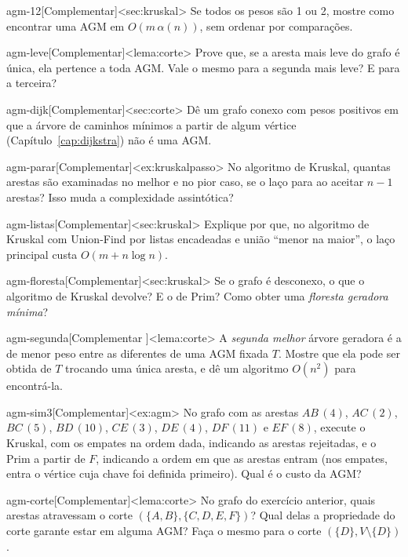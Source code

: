 \begin{exercicio}{agm-12}[Complementar]<sec:kruskal>
Se todos os pesos são 1 ou 2, mostre como encontrar uma AGM em $O(m\,\alpha(n))$, sem ordenar por comparações.
\end{exercicio}
\begin{exercicio}{agm-leve}[Complementar]<lema:corte>
Prove que, se a aresta mais leve do grafo é única, ela pertence a toda AGM. Vale o mesmo para a segunda mais leve? E para a terceira?
\end{exercicio}
\begin{exercicio}{agm-dijk}[Complementar]<sec:corte>
Dê um grafo conexo com pesos positivos em que a árvore de caminhos mínimos a partir de algum vértice (Capítulo~\ref{cap:dijkstra}) não é uma AGM.
\end{exercicio}
\begin{exercicio}{agm-parar}[Complementar]<ex:kruskalpasso>
No algoritmo de Kruskal, quantas arestas são examinadas no melhor e no pior caso, se o laço para ao aceitar $n-1$ arestas? Isso muda a complexidade assintótica?
\end{exercicio}
\begin{exercicio}{agm-listas}[Complementar]<sec:kruskal>
Explique por que, no algoritmo de Kruskal com Union-Find por listas encadeadas e união ``menor na maior'', o laço principal custa $O(m+n\log n)$.
\end{exercicio}
\begin{exercicio}{agm-floresta}[Complementar]<sec:kruskal>
Se o grafo é desconexo, o que o algoritmo de Kruskal devolve? E o de Prim? Como obter uma \emph{floresta geradora mínima}?
\end{exercicio}
\begin{exercicio}{agm-segunda}[Complementar \estrela]<lema:corte>
A \emph{segunda melhor} árvore geradora é a de menor peso entre as diferentes de uma AGM fixada $T$. Mostre que ela pode ser obtida de $T$ trocando uma única aresta, e dê um algoritmo $O(n^2)$ para encontrá-la.
\end{exercicio}
\begin{exercicio}{agm-sim3}[Complementar]<ex:agm>
No grafo com as arestas $AB\,(4)$, $AC\,(2)$, $BC\,(5)$, $BD\,(10)$, $CE\,(3)$, $DE\,(4)$, $DF\,(11)$ e $EF\,(8)$, execute o Kruskal, com os empates na ordem dada, indicando as arestas rejeitadas, e o Prim a partir de $F$, indicando a ordem em que as arestas entram (nos empates, entra o vértice cuja chave foi definida primeiro). Qual é o custo da AGM?
\end{exercicio}
\begin{exercicio}{agm-corte}[Complementar]<lema:corte>
No grafo do exercício anterior, quais arestas atravessam o corte $(\{A,B\},\{C,D,E,F\})$? Qual delas a propriedade do corte garante estar em alguma AGM? Faça o mesmo para o corte $(\{D\},V\setminus\{D\})$.
\end{exercicio}
